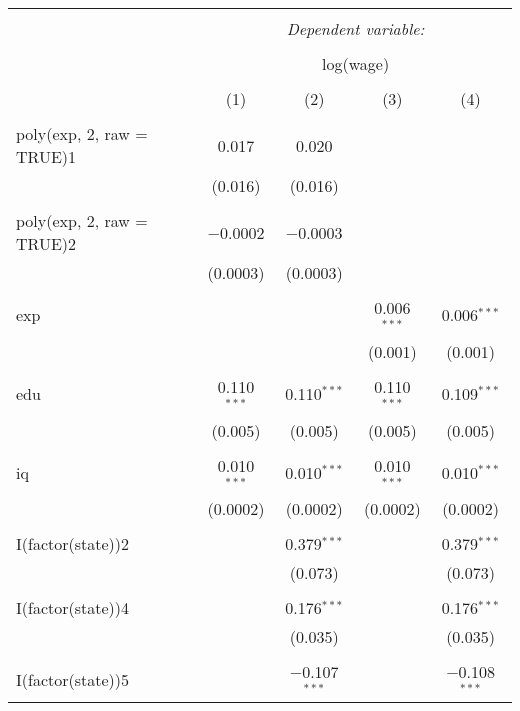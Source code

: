 
\begin{table}[!htbp] \centering 
  \caption{} 
  \label{} 
\begin{tabular}{@{\extracolsep{5pt}}lcccc} 
\\[-1.8ex]\hline 
\hline \\[-1.8ex] 
 & \multicolumn{4}{c}{\textit{Dependent variable:}} \\ 
\cline{2-5} 
\\[-1.8ex] & \multicolumn{4}{c}{log(wage)} \\ 
\\[-1.8ex] & (1) & (2) & (3) & (4)\\ 
\hline \\[-1.8ex] 
 poly(exp, 2, raw = TRUE)1 & 0.017 & 0.020 &  &  \\ 
  & (0.016) & (0.016) &  &  \\ 
  & & & & \\ 
 poly(exp, 2, raw = TRUE)2 & $-$0.0002 & $-$0.0003 &  &  \\ 
  & (0.0003) & (0.0003) &  &  \\ 
  & & & & \\ 
 exp &  &  & 0.006$^{***}$ & 0.006$^{***}$ \\ 
  &  &  & (0.001) & (0.001) \\ 
  & & & & \\ 
 edu & 0.110$^{***}$ & 0.110$^{***}$ & 0.110$^{***}$ & 0.109$^{***}$ \\ 
  & (0.005) & (0.005) & (0.005) & (0.005) \\ 
  & & & & \\ 
 iq & 0.010$^{***}$ & 0.010$^{***}$ & 0.010$^{***}$ & 0.010$^{***}$ \\ 
  & (0.0002) & (0.0002) & (0.0002) & (0.0002) \\ 
  & & & & \\ 
 I(factor(state))2 &  & 0.379$^{***}$ &  & 0.379$^{***}$ \\ 
  &  & (0.073) &  & (0.073) \\ 
  & & & & \\ 
 I(factor(state))4 &  & 0.176$^{***}$ &  & 0.176$^{***}$ \\ 
  &  & (0.035) &  & (0.035) \\ 
  & & & & \\ 
 I(factor(state))5 &  & $-$0.107$^{***}$ &  & $-$0.108$^{***}$ \\ 

\end{tabular}
\end{table}
